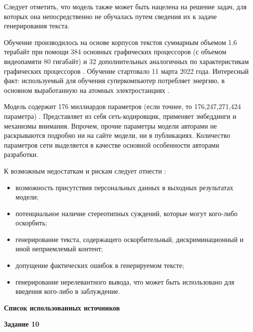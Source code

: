 \documentclass[12pt, a4paper]{extarticle}
\newenvironment*{dummyenv}{}{}
\newcommand{\mysection}[1]{
    \addcontentsline{toc}{section}{#1}
    \begin{dummyenv}
        \bfseries\large #1
    \end{dummyenv}
}
\begin{document}
Следует отметить, что модель также может быть нацелена на решение задач, для которых она непосредственно
не обучалась путем сведения их к задаче генерирования текста.

Обучение производилось на основе корпусов текстов суммарным объемом 1.6 терабайт \cite{bib:what-to-tarin}
при помощи 384 основных графических процессоров (с объемом видеопамяти 80 гигабайт) и 32 дополнительных
аналогичных по характеристикам графических процессоров \cite{bib:bloom-hf}. Обучение стартовало 11 марта
2022 года. Интересный факт: используемый для обучения суперкомпьютер потребляет энергию, в основном
выработанную на атомных электростанциях \cite{bib:bloom-hf}.

Модель содержит 176 миллиардов параметров (если точнее, то 176,247,271,424 параметра) \cite{bib:bloom-arxiv, 
bib:bloom-hf}. Представляет из себя сеть-кодировщик, применяет эмбеддинги и механизмы внимания. Впрочем, 
прочие параметры модели авторами не раскрываются подробно ни на сайте модели, ни в публикациях. Количество
параметров сети выделяется в качестве основной особенности авторами разработки.

К возможным недостаткам и рискам следует отнести \cite{bib:bloom-hf}:
\begin{itemize}
    \item возможность присутствия персональных данных в выходных результатах модели;
    \item потенциальное наличие стереотипных суждений, которые могут кого-либо оскорбить;
    \item генерирование текста, содержащего оскорбительный, дискриминационный и иной неприемлемый контент;
    \item допущение фактических ошибок в генерируемом тексте;
    \item генерирование нерелевантного вывода, что может быть использовано для введения кого-либо в заблуждение.
\end{itemize} 

\textbf{Список использованных источников}



\mysection{Задание 10}
\end{document}
